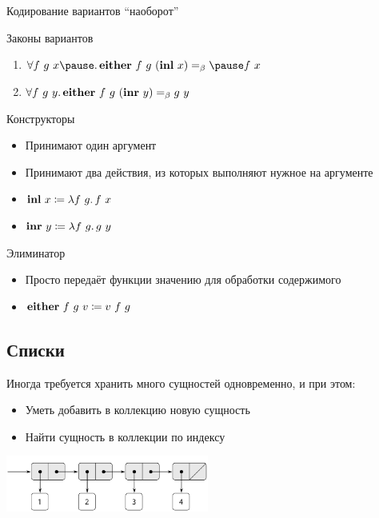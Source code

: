     \begin{frame}[fragile]{Кодирование вариантов ``наоборот''}
        \begin{block}{Законы вариантов}
            \begin{enumerate}
                \item $\forall f~g~x \pause \ldotp \term{either} \ap f \ap g \ap (\term{inl} \ap x) \eqbeta \pause f \ap x$
                \item $\forall f~g~y \ldotp \mathbf{either} ~ f ~ g ~ (\mathbf{inr} ~ y) =_\beta g ~ y$
            \end{enumerate}
        \end{block}
        \pause
        \begin{block}{Конструкторы}
            \begin{itemize}
                \item Принимают один аргумент
                \item Принимают два действия, из которых выполняют нужное на аргументе
                \item $\mathbf{inl} ~ x \coloneqq \lambda f~g \ldotp f ~ x$
                \item $\mathbf{inr} ~ y \coloneqq \lambda f~g \ldotp g ~ y$
            \end{itemize}
        \end{block}
        \pause
        \begin{block}{Элиминатор}
            \begin{itemize}
                \item Просто передаёт функции значению для обработки содержимого
                \item $\mathbf{either} ~ f ~ g ~ v \coloneqq v ~ f ~ g$
            \end{itemize}
        \end{block}
    \end{frame}

    \subsection{Списки}

    \begin{frame}{\subsecname}
        Иногда требуется хранить много сущностей одновременно, и при этом:
        \begin{itemize}
            \item Уметь добавить в коллекцию новую сущность
            \item Найти сущность в коллекции по индексу
        \end{itemize}
        \vspace{0.5em}
        \begin{center}
            \includegraphics[width=0.5\textwidth]{figs/list}
        \end{center}
    \end{frame}

